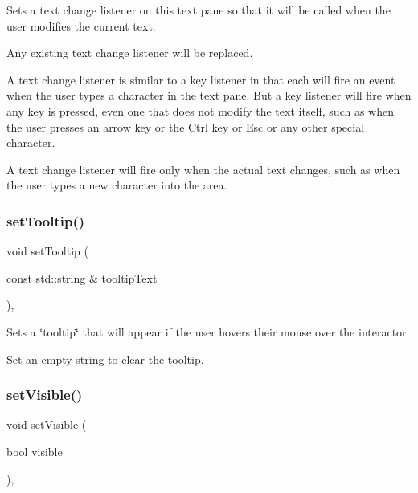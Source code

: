 Sets a text change listener on this text pane so that it will be called when the user modifies the current text. 

Any existing text change listener will be replaced.

A text change listener is similar to a key listener in that each will fire an event when the user types a character in the text pane. But a key listener will fire when any key is pressed, even one that does not modify the text itself, such as when the user presses an arrow key or the Ctrl key or Esc or any other special character.

A text change listener will fire only when the actual text changes, such as when the user types a new character into the area. \mbox{\label{classGInteractor_a039e0e49beaecc275efce02d416acea8}} 
\subsubsection{\texorpdfstring{set\+Tooltip()}{setTooltip()}}
{\footnotesize\ttfamily void set\+Tooltip (\begin{DoxyParamCaption}\item[{const std\+::string \&}]{tooltip\+Text }\end{DoxyParamCaption})\hspace{0.3cm}{\ttfamily [virtual]}, {\ttfamily [inherited]}}



Sets a \char`\"{}tooltip\char`\"{} that will appear if the user hovers their mouse over the interactor. 

\mbox{\hyperlink{classSet}{Set}} an empty string to clear the tooltip. \mbox{\label{classGInteractor_a18e44e30b31525a243960ca3928125aa}} 
\subsubsection{\texorpdfstring{set\+Visible()}{setVisible()}}
{\footnotesize\ttfamily void set\+Visible (\begin{DoxyParamCaption}\item[{bool}]{visible }\end{DoxyParamCaption})\hspace{0.3cm}{\ttfamily [virtual]}, {\ttfamily [inherited]}}



